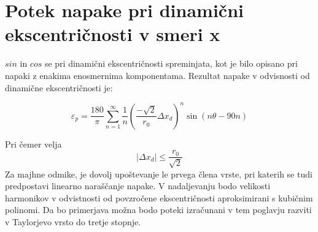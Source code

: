 \section{Potek napake pri dinamični ekscentričnosti v smeri x}

$sin$ in $cos$ se pri dinamični ekscentričnosti spreminjata, kot je bilo opisano pri napaki z enakima enosmernima komponentama. Rezultat napake v odvisnosti od dinamične ekscentričnosti je:


%
%
%
\begin{equation}
\label{vrsta_xd}
\varepsilon_p=
\frac{180}{\pi}\sum_{n=1}^{\infty}\frac{1}{n}( \frac{-\sqrt{2}}{r_0}\Delta x_d)^n \sin (n \theta -  90 n)
\end{equation}

Pri čemer velja
$$|\Delta x_d|\leq \frac{r_0}{\sqrt{2}}$$
%
%
Za majhne odmike, je dovolj upoštevanje le prvega člena vrste, pri katerih se tudi predpostavi linearno naraščanje napake. V nadaljevanju bodo velikosti harmonikov v odvistnosti od povzročene ekscentričnosti aproksimirani s kubičnim polinomi. Da bo primerjava možna bodo poteki izračunani v tem poglavju razviti v Taylorjevo vrsto do tretje stopnje.
% 









